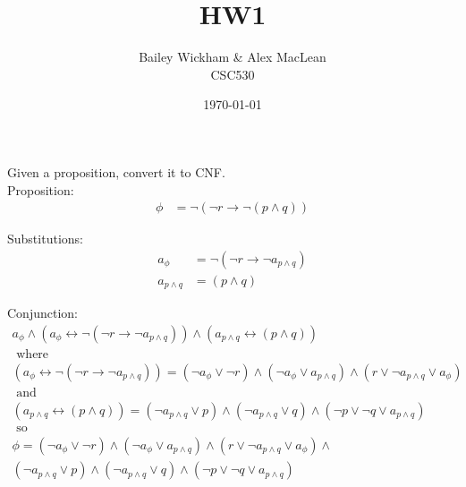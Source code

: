 \documentclass{article}
\title{HW1}
\author{Bailey Wickham \& Alex MacLean\\ CSC530}
\date\today
\begin{document}
\maketitle

\subsection{}
Given a proposition, convert it to CNF.\\
Proposition:
\begin{align*}
    \phi &= \neg (\neg r \rightarrow \neg (p \wedge q))
\end{align*}

Substitutions:
\begin{align*}
    a_{\phi} &= \neg (\neg r \rightarrow \neg a_{p \wedge q}) \\
    a_{p\wedge q} &= (p \wedge q)
\end{align*}

Conjunction:
\begin{gather*}
    a_{\phi} \wedge (a_{\phi} \leftrightarrow \neg (\neg r \rightarrow \neg a_{p \wedge q})) \land
    (a_{p\wedge q} \leftrightarrow (p \wedge q))
    \\ \text{ where }  \\
    (a_{\phi} \leftrightarrow \neg (\neg r \rightarrow \neg a_{p \wedge q})) =
(\neg a_\phi \lor \neg r) \land (\neg a_\phi \lor a_{p \land q}) \land (r \lor \neg a_{p \land q} \lor a_\phi) \\
    \text{ and } \\
    (a_{p\wedge q} \leftrightarrow (p \wedge q)) =
    (\neg a_{p\wedge q} \lor p ) \land (\neg a_{p\land q} \lor q) \wedge (\neg p \lor \neg q \lor a_{p\wedge q}) \\
    \text{ so } \\
    \phi =
(\neg a_\phi \lor \neg r) \land (\neg a_\phi \lor a_{p \land q}) \land (r \lor \neg a_{p \land q} \lor a_\phi) \land \\
    (\neg a_{p\wedge q} \lor p ) \land (\neg a_{p\land q} \lor q) \wedge (\neg p \lor \neg q \lor a_{p\wedge q})
\end{gather*}
\end{document}
